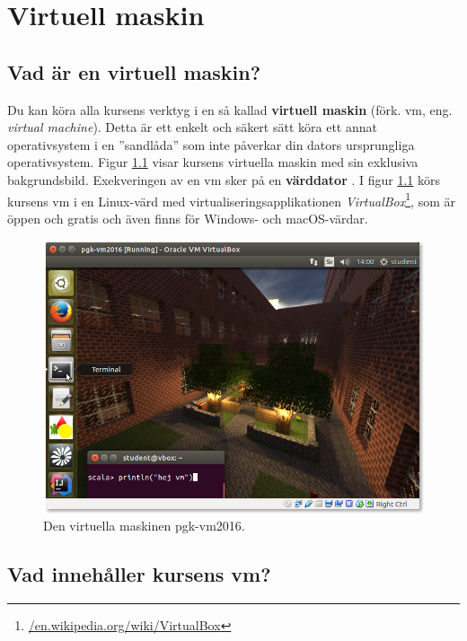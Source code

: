 
\chapter{Virtuell maskin}\label{appendix:vbox}

\section{Vad är en virtuell maskin?}

Du kan köra alla kursens verktyg i en så kallad \textbf{virtuell maskin} (förk. vm, eng. \textit{virtual machine}). 
Detta är ett enkelt och säkert sätt köra ett annat operativsystem i en ''sandlåda'' som inte påverkar din dators ursprungliga operativsystem. Figur \ref{fig:vm} visar kursens virtuella maskin med sin exklusiva bakgrundsbild. Exekveringen av en vm sker på en \textbf{värddator} . I figur \ref{fig:vm} körs kursens vm i en Linux-värd med virtualiseringsapplikationen \textit{VirtualBox}\footnote{\href{https://en.wikipedia.org/wiki/VirtualBox}{/en.wikipedia.org/wiki/VirtualBox}}, som är öppen och gratis och även finns för Windows- och macOS-värdar. 



\begin{figure}[H]
\centering
\includegraphics[width=1.0\textwidth]{../img/vm.png}
\caption{Den virtuella maskinen pgk-vm2016.}
\label{fig:vm}
\end{figure}


\section{Vad innehåller kursens vm?}

